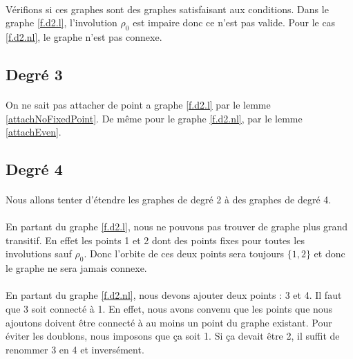 \documentclass[a4paper]{article}
\theoremstyle{mytheorem}
\begin{document}
\paragraph{}
Vérifions si ces graphes sont des graphes satisfaisant aux conditions. Dans le graphe \ref{f.d2.l}, l'involution $\rho_0$ est impaire donc ce n'est pas valide. Pour le cas \ref{f.d2.nl}, le graphe n'est pas connexe.

\subsection{Degré 3}

\paragraph{}
On ne sait pas attacher de point a graphe \ref{f.d2.l} par le lemme \ref{attachNoFixedPoint}. De même pour le graphe \ref{f.d2.nl}, par le lemme \ref{attachEven}.

\subsection{Degré 4}

\paragraph{}
Nous allons tenter d'étendre les graphes de degré 2 à des graphes de degré 4.

\paragraph{}
En partant du graphe \ref{f.d2.l}, nous ne pouvons pas trouver de graphe plus grand transitif. En effet les points 1 et 2 dont des points fixes pour toutes les involutions sauf $\rho_0$. Donc l'orbite de ces deux points sera toujours $\{1, 2\}$ et donc le graphe ne sera jamais connexe.

\paragraph{}
En partant du graphe \ref{f.d2.nl}, nous devons ajouter deux points : 3 et 4. Il faut que 3 soit connecté à 1. En effet, nous avons convenu que les points que nous ajoutons doivent être connecté à au moins un point du graphe existant. Pour éviter les doublons, nous imposons que ça soit 1. Si ça devait être 2, il suffit de renommer 3 en 4 et inversément.
\end{document}
